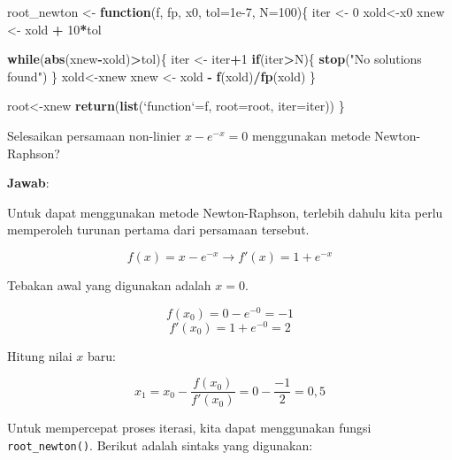 \documentclass[]{book}
\newenvironment{Shaded}{\begin{snugshade}}{\end{snugshade}}
\newcommand{\ControlFlowTok}[1]{\textcolor[rgb]{0.13,0.29,0.53}{\textbf{#1}}}
\newcommand{\DataTypeTok}[1]{\textcolor[rgb]{0.13,0.29,0.53}{#1}}
\newcommand{\DecValTok}[1]{\textcolor[rgb]{0.00,0.00,0.81}{#1}}
\newcommand{\FloatTok}[1]{\textcolor[rgb]{0.00,0.00,0.81}{#1}}
\newcommand{\KeywordTok}[1]{\textcolor[rgb]{0.13,0.29,0.53}{\textbf{#1}}}
\newcommand{\NormalTok}[1]{#1}
\newcommand{\OperatorTok}[1]{\textcolor[rgb]{0.81,0.36,0.00}{\textbf{#1}}}
\newcommand{\StringTok}[1]{\textcolor[rgb]{0.31,0.60,0.02}{#1}}
\theoremstyle{definition}
\theoremstyle{definition}
\theoremstyle{definition}
\theoremstyle{remark}
\let\BeginKnitrBlock\begin \let\EndKnitrBlock\end
\begin{document}
\begin{Shaded}
\begin{Highlighting}[]
\NormalTok{root_newton <-}\StringTok{ }\ControlFlowTok{function}\NormalTok{(f, fp, x0, }\DataTypeTok{tol=}\FloatTok{1e-7}\NormalTok{, }\DataTypeTok{N=}\DecValTok{100}\NormalTok{)\{}
\NormalTok{  iter <-}\StringTok{ }\DecValTok{0}
\NormalTok{  xold<-x0}
\NormalTok{  xnew <-}\StringTok{ }\NormalTok{xold }\OperatorTok{+}\StringTok{ }\DecValTok{10}\OperatorTok{*}\NormalTok{tol}
  
  \ControlFlowTok{while}\NormalTok{(}\KeywordTok{abs}\NormalTok{(xnew}\OperatorTok{-}\NormalTok{xold)}\OperatorTok{>}\NormalTok{tol)\{}
\NormalTok{    iter <-}\StringTok{ }\NormalTok{iter}\OperatorTok{+}\DecValTok{1}
    \ControlFlowTok{if}\NormalTok{(iter}\OperatorTok{>}\NormalTok{N)\{}
      \KeywordTok{stop}\NormalTok{(}\StringTok{"No solutions found"}\NormalTok{)}
\NormalTok{    \}}
\NormalTok{    xold<-xnew}
\NormalTok{    xnew <-}\StringTok{ }\NormalTok{xold }\OperatorTok{-}\StringTok{ }\KeywordTok{f}\NormalTok{(xold)}\OperatorTok{/}\KeywordTok{fp}\NormalTok{(xold)  }
\NormalTok{  \}}
  
\NormalTok{  root<-xnew}
  \KeywordTok{return}\NormalTok{(}\KeywordTok{list}\NormalTok{(}\StringTok{`}\DataTypeTok{function}\StringTok{`}\NormalTok{=f, }\DataTypeTok{root=}\NormalTok{root, }\DataTypeTok{iter=}\NormalTok{iter))}
\NormalTok{\}}
\end{Highlighting}
\end{Shaded}

\BeginKnitrBlock{example}
\protect\hypertarget{exm:newtonraphsonexmp}{}{\label{exm:newtonraphsonexmp} }Selesaikan persamaan non-linier \(x-e^{-x}=0\) menggunakan metode Newton-Raphson?
\EndKnitrBlock{example}

\textbf{Jawab}:

Untuk dapat menggunakan metode Newton-Raphson, terlebih dahulu kita perlu memperoleh turunan pertama dari persamaan tersebut.

\[
f\left(x\right)=x-e^{-x}\to f'\left(x\right)=1+e^{-x}
\]

Tebakan awal yang digunakan adalah \(x=0\).

\[
f\left(x_0\right)=0-e^{-0}=-1
\]
\[
f'\left(x_0\right)=1+e^{-0}=2
\]

Hitung nilai \(x\) baru:

\[
x_1=x_0-\frac{f\left(x_0\right)}{f'\left(x_0\right)}=0-\frac{-1}{2}=0,5
\]

Untuk mempercepat proses iterasi, kita dapat menggunakan fungsi \texttt{root\_newton()}. Berikut adalah sintaks yang digunakan:
\end{document}
